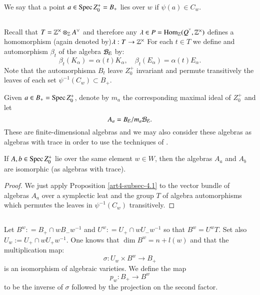 We say that a point $a\in \operatorname{Spec} Z_{0}^{+}= B_{+}$ lies over $w$ if $\psi(a) \in C_{w}$. 

\subsection{}\label{art4-subsec-4.4}
Recall that $T=\bbZ^{\times}\otimes_{\bbZ}A\spcheck$ and therefore any $\lambda \in P = \Hom_{\bbZ}(Q^{\spcheck}, \bbZ^{\times})$ defines a homomorphism (again denoted by)$\lambda: T\rightarrow \mathbb{Z}^{\times}$ For each $t\in T$ we define and automorphism $\beta_{t}$ of the algebra $\mathcal{B}_{\mathcal{E}}$ by:
$$
\beta_{t}(K_{\alpha}) = \alpha(t)K_{\alpha}, \quad \beta_{t}(E_{\alpha}) = \alpha(t)E_{\alpha}.
$$
Note that the automorphisma $B_{t}$ leave $Z_{0}^{+}$ invariant and permute transitively the leaves of each set $\psi^{-1}(C_{w})\subset B_{+}$.

Given $a\in B_{+}=\operatorname{Spec} Z_{0}^{+}$, denote by $m_{a}$ the corresponding maximal ideal of $Z_{0}^{+}$ and let 
$$
A_{a}=B_{\mathcal{E}}/m_{a}\mathcal{B}_{\mathcal{E}}.
$$
These are finite-dimensional algebras and we may also consider these algebras as algebras with trace in order to use the techniques of \cite{art4-keyDKP2}.

\begin{theorem*}
If $A,b \in \operatorname{Spec} Z_{0}^{+}$ lie over the same element $w \in W$, then the algebras $A_{a}$ and $A_{b}$ are isomorphic (as algebras with trace).
\end{theorem*}

\begin{proof}
We just apply Proposition \ref{art4-subsec-4.1} to the vector bundle of algebras $A_{a}$ over a symplectic leat and the group $T$ of algebra automorphisms which permutes the leaves in $\psi^{-1}(C_{w})$ transitively.
\end{proof}

\subsection{}\label{art4-subsec-4.5}
Let $B^{w}: =B_{+}\cap w B_{-}w^{-1}$ and $U^{w} : =U_{+}\cap wU_{-}w^{-1}$ so that  $B^{w} = U^{w}T$. Set also $U_{w}:=U_{+} \cap wU_{+}w^{-1}$. One knows that $\dim B^{w} = n+l(w)$ and that the multiplication map:
$$
\sigma : U_{w} \times B^{w} \rightarrow B_{+}
$$
is an isomorphism of algebraic varieties. We define the map
$$
p_{w} : B_{+} \rightarrow B^{w}
$$
to be the inverse of $\sigma$ followed by the projection on the second factor.

